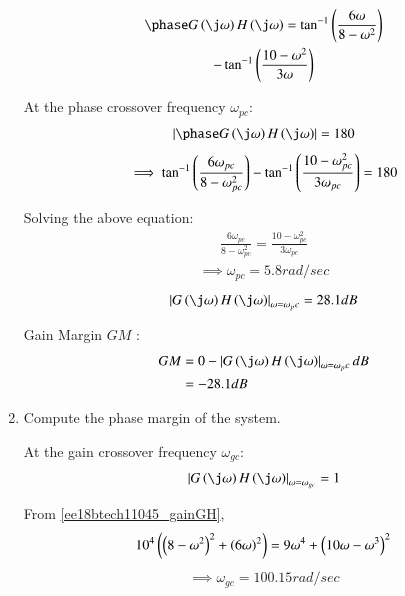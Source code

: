 \begin{enumerate}[label=\thesubsection.\arabic*.,ref=\thesubsection.\theenumi]
\begin{multline}
        \phase G\brak{\j\omega}H\brak{\j\omega} = \tan^{-1}\brak{\frac{6\omega}{8 - \omega^2}} \\ - \tan^{-1}\brak{\frac{10 - \omega^2}{3\omega}}
    \label{ee18btech11045_phaseGH}
\end{multline}

At the phase crossover frequency $\omega_{pc}$:
\begin{align}
    \abs{\phase G\brak{\j\omega}H\brak{\j\omega}} = 180
\end{align}
\begin{align}
    \implies \tan^{-1}\left(\frac{6\omega_{pc}}{8 - \omega_{pc}^2}\right) - \tan^{-1}\left(\frac{10-\omega_{pc}^2}{3\omega_{pc}}\right) = 180
\end{align}

Solving the above equation:
\begin{align}
    \frac{6\omega_{pc}}{8 - \omega_{pc}^2} = \frac{10-\omega_{pc}^2}{3\omega_{pc}}
\end{align}
\begin{align}
    \implies \omega_{pc} = 5.8 rad/sec
\end{align}
\begin{align}
    \abs{G\brak{\j\omega}H\brak{\j\omega}}_{\omega=\omega_pc} = 28.1 dB
\end{align}

Gain Margin {$GM$} :
\begin{align}
    GM &= 0 - \abs{G\brak{\j\omega}H\brak{\j\omega}}_{\omega=\omega_pc} dB
    \\&= -28.1 dB
\end{align}


\item Compute the phase margin of the system.

\solution

At the gain crossover frequency $\omega_{gc}$:
\begin{align}
    \abs{G\brak{\j\omega}H\brak{\j\omega}}_{\omega=\omega_{gc}} = 1
\end{align}

From \eqref{ee18btech11045_gainGH},
\begin{align}
    10^4\left(\left(8-\omega^2\right)^2 + \left(6\omega\right)^2\right) = 9\omega^4 + \left(10\omega - \omega^3\right)^2
\end{align}
\begin{align}
    \implies \omega_{gc} = 100.15 rad/sec
\end{align}


\end{enumerate}
